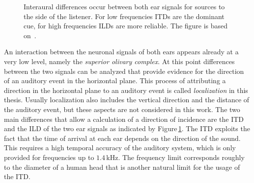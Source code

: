 \begin{figure}[t]
    \small
    \centering
    \caption{Interaural differences occur between both ear signals for sources to the
    side of the listener. For low frequencies \acp{ITD} are the dominant cue,
    for high frequencies \acp{ILD} are more reliable.
    The figure is based on~\cite{Grothe2010}.
    }
    \label{fig:itdild}
\end{figure}
%
An interaction between the neuronal signals of both ears appears already
at a very low level, namely the \emph{superior olivary complex}. At this point
differences between the two signals can be analyzed that provide evidence for
the direction of an auditory event in the horizontal plane. This process of
attributing a direction in the horizontal plane to an auditory event is called
\emph{localization} in this thesis. Usually localization also includes
the vertical direction and the distance of the auditory event, but these aspects
are not considered in this work.
The two main differences that allow a calculation of a direction of incidence
are the \acf{ITD} and the \acf{ILD} of the two ear signals as indicated by
Figure\,\ref{fig:itdild}. The \ac{ITD} exploits the fact that the time of arrival
at each ear depends on the direction of the sound. This requires a
high temporal accuracy of the auditory system, which is only provided for
frequencies up to $1.4$\,kHz. The frequency limit corresponds roughly to the
diameter of a human head that is another natural limit for the usage of the \ac{ITD}.
